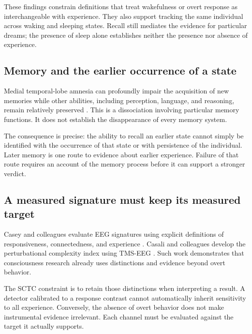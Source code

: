 \documentclass[11pt,letterpaper]{article}
\begin{document}
These findings constrain definitions that treat wakefulness or overt response as interchangeable with experience. They also support tracking the same individual across waking and sleeping states. Recall still mediates the evidence for particular dreams; the presence of sleep alone establishes neither the presence nor absence of experience.

\subsection*{Memory and the earlier occurrence of a state}
Medial temporal-lobe amnesia can profoundly impair the acquisition of new memories while other abilities, including perception, language, and reasoning, remain relatively preserved \cite{Milner2005}. This is a dissociation involving particular memory functions. It does not establish the disappearance of every memory system.

The consequence is precise: the ability to recall an earlier state cannot simply be identified with the occurrence of that state or with persistence of the individual. Later memory is one route to evidence about earlier experience. Failure of that route requires an account of the memory process before it can support a stronger verdict.

\subsection*{A measured signature must keep its measured target}
Casey and colleagues evaluate EEG signatures using explicit definitions of responsiveness, connectedness, and experience \cite{Casey2024}. Casali and colleagues develop the perturbational complexity index using TMS-EEG \cite{Casali2013}. Such work demonstrates that consciousness research already uses distinctions and evidence beyond overt behavior.

The SCTC constraint is to retain those distinctions when interpreting a result. A detector calibrated to a response contrast cannot automatically inherit sensitivity to all experience. Conversely, the absence of overt behavior does not make instrumental evidence irrelevant. Each channel must be evaluated against the target it actually supports.
\end{document}
